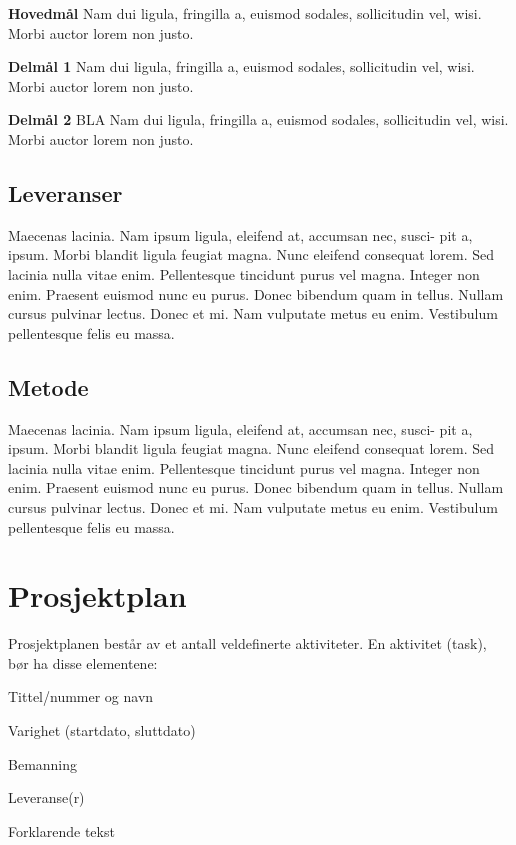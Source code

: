 \documentclass[11pt,a4paper]{report}
\begin{document}
\begin{compactitem}
\item [{\bf Hovedmål}] Nam dui ligula, fringilla a, euismod sodales, sollicitudin vel, wisi. Morbi
auctor lorem non justo.
\begin{compactitem}
\item [{\bf  Delmål 1} ] Nam dui ligula, fringilla a, euismod sodales, sollicitudin vel, wisi. Morbi
auctor lorem non justo.
\item [{\bf  Delmål 2} ] BLA Nam dui ligula, fringilla a, euismod sodales, sollicitudin vel, wisi. Morbi
auctor lorem non justo.
\end{compactitem}
\end{compactitem}

\subsection*{Leveranser}

Maecenas lacinia. Nam ipsum ligula, eleifend at, accumsan nec, susci- pit a, ipsum. Morbi blandit ligula feugiat magna. Nunc eleifend consequat lorem. Sed lacinia nulla vitae enim. Pellentesque tincidunt purus vel magna. Integer non enim. Praesent euismod nunc eu purus. Donec bibendum quam in tellus. Nullam cursus pulvinar lectus. Donec et mi. Nam vulputate metus eu enim. Vestibulum pellentesque felis eu massa.

\subsection*{Metode}
Maecenas lacinia. Nam ipsum ligula, eleifend at, accumsan nec, susci- pit a, ipsum. Morbi blandit ligula feugiat magna. Nunc eleifend consequat lorem. Sed lacinia nulla vitae enim. Pellentesque tincidunt purus vel magna. Integer non enim. Praesent euismod nunc eu purus. Donec bibendum quam in tellus. Nullam cursus pulvinar lectus. Donec et mi. Nam vulputate metus eu enim. Vestibulum pellentesque felis eu massa.


\section*{Prosjektplan}

Prosjektplanen består av et antall veldefinerte aktiviteter. En aktivitet (task), bør ha disse elementene: 

\begin{compactitem}
\item Tittel/nummer og navn
\item Varighet (startdato, sluttdato)
\item Bemanning 
\item Leveranse(r)
\item Forklarende tekst
\end{compactitem}
\end{document}
